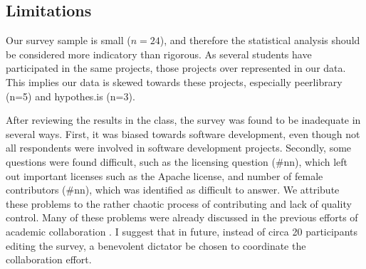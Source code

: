 \subsection{Limitations}
\label{sec:limitations}

Our survey sample is small ($n=24$), and therefore the statistical analysis should be considered more indicatory than rigorous. As several students have participated in the same projects, those projects over represented in our data. This implies our data is skewed towards these projects, especially peerlibrary (n=5) and hypothes.is (n=3).

After reviewing the results in the class, the survey was found to be inadequate in several ways. First, it was biased towards software development, even though not all respondents were involved in software development projects. Secondly, some questions were found difficult, such as the licensing question (\#nn), which left out important licenses such as the Apache license, and number of female contributors (\#nn), which was identified as difficult to answer. We attribute these problems to the rather chaotic process of contributing and lack of quality control.  Many of these problems were already discussed in the previous efforts of academic collaboration \cite{Tomlinson2012}. I suggest that in future, instead of circa 20 participants editing the survey, a benevolent dictator be chosen to coordinate the collaboration effort.

